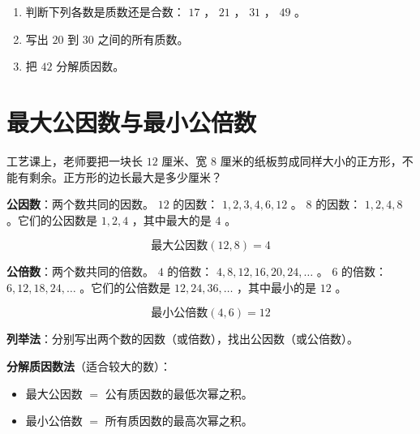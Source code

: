 \begin{practice}


\begin{enumerate}
  \item 判断下列各数是质数还是合数： $17$ ， $21$ ， $31$ ， $49$ 。
  \item 写出 $20$ 到 $30$ 之间的所有质数。
  \item 把 $42$ 分解质因数。
\end{enumerate}


\end{practice}

\section*{最大公因数与最小公倍数}


\begin{explore}


工艺课上，老师要把一块长 $12$ 厘米、宽 $8$ 厘米的纸板剪成同样大小的正方形，不能有剩余。正方形的边长最大是多少厘米？

\end{explore}

\begin{understand}


\textbf{公因数}：两个数共同的因数。 $12$ 的因数： $1, 2, 3, 4, 6, 12$ 。 $8$ 的因数： $1, 2, 4, 8$ 。它们的公因数是 $1, 2, 4$ ，其中最大的是 $4$ 。

\[
\text{最大公因数}(12, 8) = 4
\]


\textbf{公倍数}：两个数共同的倍数。 $4$ 的倍数： $4, 8, 12, 16, 20, 24, \ldots$ 。 $6$ 的倍数： $6, 12, 18, 24, \ldots$ 。它们的公倍数是 $12, 24, 36, \ldots$ ，其中最小的是 $12$ 。

\[
\text{最小公倍数}(4, 6) = 12
\]


\textbf{列举法}：分别写出两个数的因数（或倍数），找出公因数（或公倍数）。

\textbf{分解质因数法}（适合较大的数）：
\begin{itemize}
  \item 最大公因数 $=$ 公有质因数的最低次幂之积。
  \item 最小公倍数 $=$ 所有质因数的最高次幂之积。
\end{itemize}


\end{understand}

